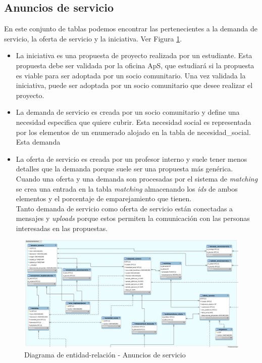 \documentclass[11pt]{book}
\begin{document}
	\subsection{Anuncios de servicio}
	En este conjunto de tablas podemos encontrar las pertenecientes a la demanda de servicio, la oferta de servicio y la iniciativa. Ver Figura \ref{fig:anuncios}.
	\begin{itemize} 
		\item La iniciativa es una propuesta de proyecto realizada por un estudiante. Esta propuesta debe ser validada por la oficina ApS, que estudiará si la propuesta es viable para ser adoptada por un socio comunitario. Una vez validada la iniciativa, puede ser adoptada por un socio comunitario que desee realizar el proyecto.
		\item La demanda de servicio es creada por un socio comunitario y define una necesidad especifica que quiere cubrir. Esta necesidad social es representada por los elementos de un enumerado alojado en la tabla de necesidad\_social. Esta demanda
		\item La oferta de servicio es creada por un profesor interno y suele tener menos detalles que la demanda porque suele ser una propuesta más genérica.\\
		Cuando una oferta y una demanda son procesadas por el sistema de \textit{matching} se crea una entrada en la tabla \textit{matching} almacenando los \textit{ids} de ambos elementos y el porcentaje de emparejamiento que tienen.\\
		Tanto demanda de servicio como oferta de servicio están conectadas a mensajes y \textit{uploads} porque estos permiten la comunicación con las personas interesadas en las propuestas.
	\end{itemize}
	\begin{landscape}
		\begin{figure}[p]
			\includegraphics[scale=0.54]{anuncios}
			\caption{Diagrama de entidad-relación - Anuncios de servicio}
			\label{fig:anuncios}
		\end{figure}
	\end{landscape}
	
\end{document}
